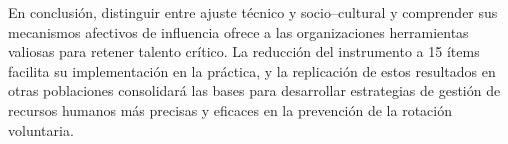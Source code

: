 En conclusión, distinguir entre ajuste técnico y socio–cultural y comprender sus mecanismos afectivos de influencia ofrece a las organizaciones herramientas valiosas para retener talento crítico. La reducción del instrumento a 15 ítems facilita su implementación en la práctica, y la replicación de estos resultados en otras poblaciones consolidará las bases para desarrollar estrategias de gestión de recursos humanos más precisas y eficaces en la prevención de la rotación voluntaria.

